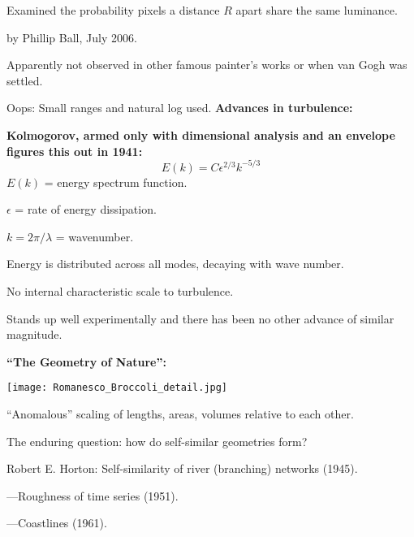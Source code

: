      
      Examined the probability pixels a distance $R$ apart share the same luminance.
     
      by Phillip Ball, July 2006.
     
      Apparently not observed in other famous painter's works
      or when van Gogh was settled.
     
      Oops: Small ranges and natural log used.
  \textbf{Advances in turbulence:}
  
  \textbf{
      Kolmogorov, armed only with dimensional analysis and an envelope
      figures this out in 1941:
    }
    $$
    E(k)
    =
    C
    \epsilon^{2/3}
    k^{-5/3}
    $$
      $E(k)$ = energy spectrum function.
     
      $\epsilon$ = rate of energy dissipation.
    
      $k = 2\pi/\lambda$ = wavenumber.
  
      Energy is distributed across all modes,
      decaying with wave number.
     
      No internal characteristic scale to turbulence.
     
      Stands up well experimentally and there has been no other advance of similar magnitude.
  
  \small
  \textbf{ ``The Geometry of Nature'': }
      
      \texttt{[image: Romanesco\_Broccoli\_detail.jpg]}\footnotemark[4]
       
        ``Anomalous'' scaling of lengths, areas, volumes relative to each other.
       
        The enduring question: how do self-similar geometries form?
    
      {Robert E. Horton}: Self-similarity of river (branching) networks (1945).\cite{horton1945a}
    
      ---Roughness of time series (1951).\cite{hurst1951a}
     
      ---Coastlines (1961).
    
